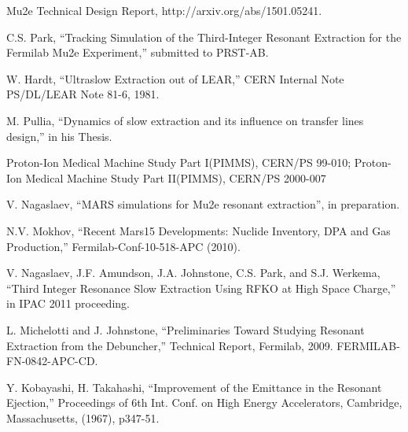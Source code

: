 \documentclass[aps,prstab,onecolumn,preprint]{revtex4-1}
\begin{document}
\begin{thebibliography}{77}
  Mu2e Technical Design Report, http://arxiv.org/abs/1501.05241.

  C.S. Park, ``Tracking Simulation of the Third-Integer Resonant Extraction for the Fermilab Mu2e Experiment,'' submitted to PRST-AB.

  W. Hardt, ``Ultraslow Extraction out of LEAR,'' CERN Internal Note PS/DL/LEAR Note 81-6, 1981.

  M. Pullia, ``Dynamics of slow extraction and its influence on transfer lines design,'' in his Thesis.

  Proton-Ion Medical Machine Study Part I(PIMMS), CERN/PS 99-010; Proton-Ion Medical Machine Study Part II(PIMMS), CERN/PS 2000-007


  V. Nagaslaev, ``MARS simulations for Mu2e resonant extraction'', in preparation.

  N.V. Mokhov, ``Recent Mars15 Developments: Nuclide Inventory, DPA and Gas Production,'' Fermilab-Conf-10-518-APC (2010).

  V. Nagaslaev, J.F. Amundson, J.A. Johnstone, C.S. Park, and S.J. Werkema,  ``Third Integer Resonance Slow Extraction Using RFKO at High Space Charge,'' in  IPAC 2011 proceeding.

  L. Michelotti and J. Johnstone, ``Preliminaries Toward Studying Resonant Extraction from the Debuncher,'' Technical Report, Fermilab, 2009. FERMILAB-FN-0842-APC-CD.

  Y. Kobayashi, H. Takahashi, ``Improvement of the Emittance in the Resonant Ejection,'' Proceedings of 6th Int. Conf. on High Energy Accelerators, Cambridge, Massachusetts, (1967), p347-51.


\end{thebibliography}
\end{document}
